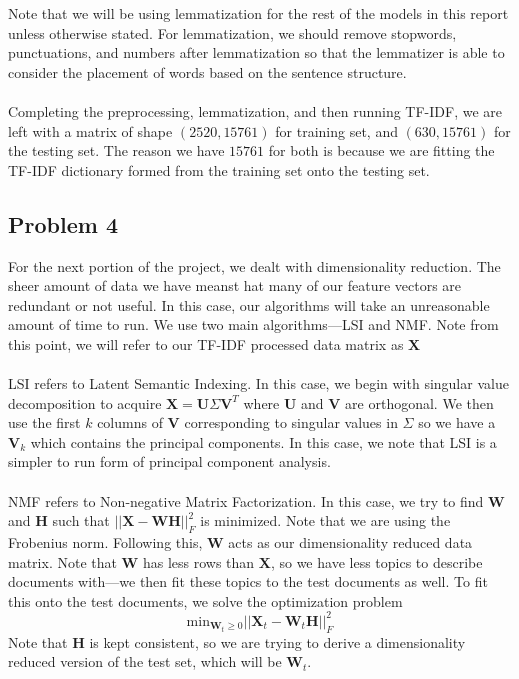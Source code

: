 \documentclass[11pt]{article}
\begin{document}
\begin{multicols}{2}
Note that we will be using lemmatization for the rest of the models in this report unless otherwise stated. For lemmatization, we should remove stopwords, punctuations, and numbers after lemmatization so that the lemmatizer is able to consider the placement of words based on the sentence structure. \\\\
Completing the preprocessing, lemmatization, and then running TF-IDF, we are left with a matrix of shape $(2520, 15761)$ for training set, and $(630, 15761)$ for the testing set. The reason we have $15761$ for both is because we are fitting the TF-IDF dictionary formed from the training set onto the testing set. 

\subsection*{Problem 4}
For the next portion of the project, we dealt with dimensionality reduction. The sheer amount of data we have meanst hat many of our feature vectors are redundant or not useful. In this case, our algorithms will take an unreasonable amount of time to run. We use two main algorithms—LSI and NMF. Note from this point, we will refer to our TF-IDF processed data matrix as $\textbf{X}$\\\\
LSI refers to Latent Semantic Indexing. In this case, we begin with singular value decomposition to acquire $\textbf{X}=\textbf{U}\Sigma\textbf{V}^T$ where $\textbf{U}$ and $\textbf{V}$ are orthogonal. We then use the first $k$ columns of $\textbf{V}$ corresponding to singular values in $\Sigma$ so we have a $\textbf{V}_k$ which contains the principal components. In this case, we note that LSI is a simpler to run form of principal component analysis.  \\\\
NMF refers to Non-negative Matrix Factorization. In this case, we try to find $\textbf{W}$ and $\textbf{H}$ such that $||\textbf{X}-\textbf{WH}||^2_F$ is minimized. Note that we are using the Frobenius norm. Following this, $\textbf{W}$ acts as our dimensionality reduced data matrix. Note that $\textbf{W}$ has less rows than $\textbf{X}$, so we have less topics to describe documents with—we then fit these topics to the test documents as well. To fit this onto the test documents, we solve the optimization problem $$\text{min}_{\textbf{W}_t\geq 0}||\textbf{X}_t-\textbf{W}_t\textbf{H}||^2_F$$
Note that $\textbf{H}$ is kept consistent, so we are trying to derive a dimensionality reduced version of the test set, which will be $\textbf{W}_t$. 

\end{multicols}
\end{document}
